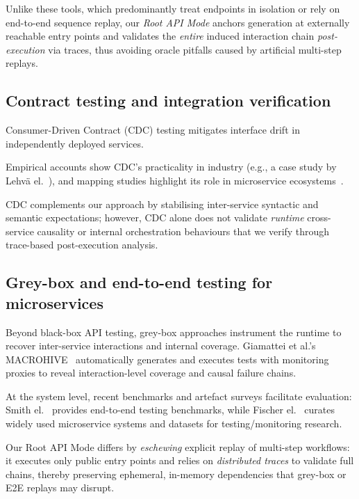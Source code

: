 \documentclass[conference]{IEEEtran}
\begin{document}
Unlike these tools, which predominantly treat endpoints in isolation or rely on end-to-end sequence replay, our \emph{Root API Mode} anchors generation at externally reachable entry points and validates the \emph{entire} induced interaction chain \emph{post-execution} via traces, thus avoiding oracle pitfalls caused by artificial multi-step replays.

\subsection{Contract testing and integration verification}
Consumer-Driven Contract (CDC) testing mitigates interface drift in independently deployed services. 

Empirical accounts show CDC’s practicality in industry (e.g., a case study by Lehv{\"a} el.~\cite{lehva2019cdc}), and mapping studies highlight its role in microservice ecosystems~\cite{waseem2020testing}. 

CDC complements our approach by stabilising inter-service syntactic and semantic expectations; however, CDC alone does not validate \emph{runtime} cross-service causality or internal orchestration behaviours that we verify through trace-based post-execution analysis.

\subsection{Grey-box and end-to-end testing for microservices}
Beyond black-box API testing, grey-box approaches instrument the runtime to recover inter-service interactions and internal coverage. 
Giamattei et al.’s MACROHIVE~\cite{giamattei2022macrohive} automatically generates and executes tests with monitoring proxies to reveal interaction-level coverage and causal failure chains. 

At the system level, recent benchmarks and artefact surveys facilitate evaluation: Smith el.~\cite{smith2023e2e-benchmark} provides end-to-end testing benchmarks, while Fischer el.~\cite{fischer2024overview} curates widely used microservice systems and datasets for testing/monitoring research. 

Our Root API Mode differs by \emph{eschewing} explicit replay of multi-step workflows: it executes only public entry points and relies on \emph{distributed traces} to validate full chains, thereby preserving ephemeral, in-memory dependencies that grey-box or E2E replays may disrupt.
\end{document}

